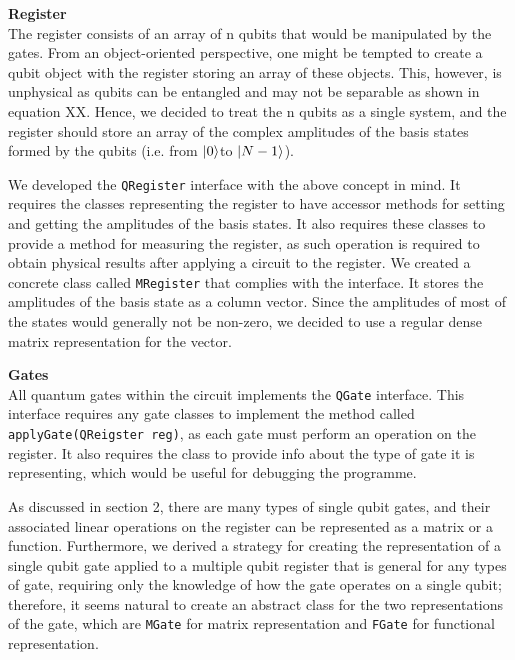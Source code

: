 \documentclass[bibliography=totocnumbered, 10pt]{article}
\theoremstyle{NoticeStyle}
\begin{document}
\begin{myenumerate}
	\item \textbf{Register}\\
The register consists of an array of n qubits that would be manipulated by the gates. From an object-oriented perspective, one might be tempted to create a qubit object with the register storing an array of these objects. This, however, is unphysical as qubits can be entangled and may not be separable as shown in equation XX. Hence, we decided to treat the n qubits as a single system, and the register should store an array of the complex amplitudes of the basis states formed by the qubits (i.e. from ${\left\vert{0}\right\rangle}$to ${\left\vert{N-1}\right\rangle}$).

We developed the \texttt{QRegister} interface with the above concept in mind. It requires the classes representing the register to have accessor methods for setting and getting the amplitudes of the basis states. It also requires these classes to provide a method for measuring the register, as such operation is required to obtain physical results after applying a circuit to the register. We created a concrete class called \texttt{MRegister} that complies with the interface. It stores the amplitudes of the basis state as a column vector. Since the amplitudes of most of the states would generally not be non-zero, we decided to use a regular dense matrix representation for the vector.

	\item \textbf{Gates}\\
	All quantum gates within the circuit implements the \texttt{QGate} interface. This interface requires any gate classes to implement the method called \texttt{applyGate(QReigster reg)}, as each gate must perform an operation on the register. It also requires the class to provide info about the type of gate it is representing, which would be useful for debugging the programme.

As discussed in section 2, there are many types of single qubit gates, and their associated linear operations on the register can be represented as a matrix or a function. Furthermore, we derived a strategy for creating the representation of a single qubit gate applied to a multiple qubit register that is general for any types of gate, requiring only the knowledge of how the gate operates on a single qubit; therefore, it seems natural to create an abstract class for the two representations of the gate, which are \texttt{MGate} for matrix representation and \texttt{FGate} for functional representation.


\end{myenumerate}
\end{document}
